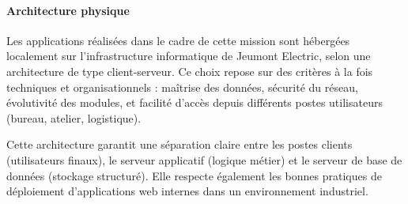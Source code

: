 \documentclass[11pt,a4paper]{article}
\begin{document}
\paragraph{Architecture physique} 

Les applications réalisées dans le cadre de cette mission sont hébergées localement sur l’infrastructure informatique de Jeumont Electric, selon une architecture de type client-serveur. Ce choix repose sur des critères à la fois techniques et organisationnels : maîtrise des données, sécurité du réseau, évolutivité des modules, et facilité d’accès depuis différents postes utilisateurs (bureau, atelier, logistique).

Cette architecture garantit une séparation claire entre les postes clients (utilisateurs finaux), le serveur applicatif (logique métier) et le serveur de base de données (stockage structuré). Elle respecte également les bonnes pratiques de déploiement d’applications web internes dans un environnement industriel.
\end{document}
